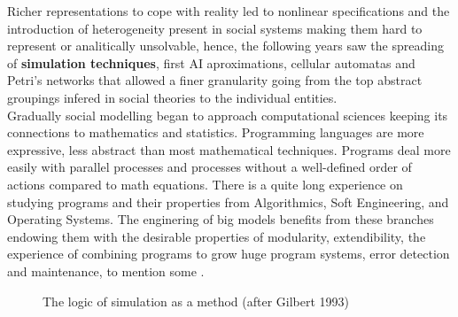 \documentclass[11pt,oneside,a4paper,openright]{report}
\begin{document}
Richer representations to cope with reality led to nonlinear specifications and the introduction of heterogeneity present in social systems making them hard to represent or analitically unsolvable, hence, the following years saw the spreading of \textbf{simulation techniques}, first AI aproximations, cellular automatas and Petri's networks that allowed a finer granularity going from the top abstract groupings infered in social theories to the individual entities.\\

Gradually social modelling began to approach computational sciences keeping its connections to mathematics and statistics. Programming languages are more expressive, less abstract than most mathematical techniques. Programs deal more easily with parallel processes and processes without a well-defined order of actions compared to math equations. There is a quite long experience on studying programs and their properties from Algorithmics, Soft Engineering, and Operating Systems. The enginering of big models benefits from these branches endowing them with the desirable properties of modularity, extendibility, the experience of combining programs to grow huge program systems, error detection and maintenance, to mention some \cite{TaberAndTimpone1996}.

\begin{figure}[h]
\centering
\setlength\fboxsep{0pt}
\setlength\fboxrule{0.5pt}
\caption{The logic of simulation as a method (after Gilbert 1993)\cite{GilbertTroitzsch}}
\label{fig:SimTL}
\end{figure}
\end{document}
